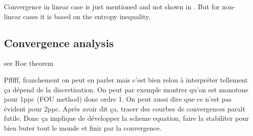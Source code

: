 Convergence in linear case is just mentioned and not shown in \cite{Cockburn}. But for non-linear cases it is based on the entropy inequality.

\subsection{Convergence analysis}
see Roe theorem \cite[p.417]{Toro}


Pfffff, franchement on peut en parler mais c'est bien relou à interpréter tellement ça dépend de la discretisation. On peut par exemple montrer qu'on est monotone pour 1ppc (FOU method) donc ordre 1. On peut aussi dire que ce n'est pas évident pour 2ppc. Après avoir dit ça, tracer des courbes de convergences paraît futile. Donc ça implique de développer la scheme equation, faire la stabiliter pour bien buter tout le monde et finir par la convergence.


